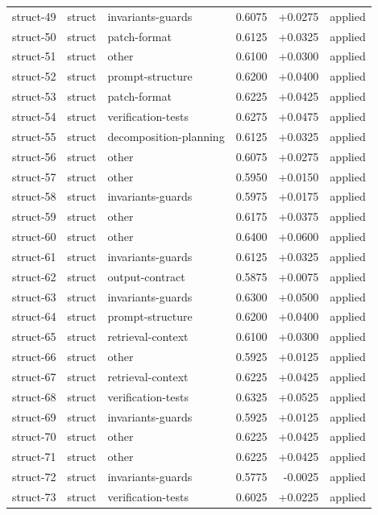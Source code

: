 \begin{center}
\begin{longtable}{llp{5.2cm}rrl}
struct-49 & struct & invariants-guards & 0.6075 & +0.0275 & applied \\
struct-50 & struct & patch-format & 0.6125 & +0.0325 & applied \\
struct-51 & struct & other & 0.6100 & +0.0300 & applied \\
struct-52 & struct & prompt-structure & 0.6200 & +0.0400 & applied \\
struct-53 & struct & patch-format & 0.6225 & +0.0425 & applied \\
struct-54 & struct & verification-tests & 0.6275 & +0.0475 & applied \\
struct-55 & struct & decomposition-planning & 0.6125 & +0.0325 & applied \\
struct-56 & struct & other & 0.6075 & +0.0275 & applied \\
struct-57 & struct & other & 0.5950 & +0.0150 & applied \\
struct-58 & struct & invariants-guards & 0.5975 & +0.0175 & applied \\
struct-59 & struct & other & 0.6175 & +0.0375 & applied \\
struct-60 & struct & other & 0.6400 & +0.0600 & applied \\
struct-61 & struct & invariants-guards & 0.6125 & +0.0325 & applied \\
struct-62 & struct & output-contract & 0.5875 & +0.0075 & applied \\
struct-63 & struct & invariants-guards & 0.6300 & +0.0500 & applied \\
struct-64 & struct & prompt-structure & 0.6200 & +0.0400 & applied \\
struct-65 & struct & retrieval-context & 0.6100 & +0.0300 & applied \\
struct-66 & struct & other & 0.5925 & +0.0125 & applied \\
struct-67 & struct & retrieval-context & 0.6225 & +0.0425 & applied \\
struct-68 & struct & verification-tests & 0.6325 & +0.0525 & applied \\
struct-69 & struct & invariants-guards & 0.5925 & +0.0125 & applied \\
struct-70 & struct & other & 0.6225 & +0.0425 & applied \\
struct-71 & struct & other & 0.6225 & +0.0425 & applied \\
struct-72 & struct & invariants-guards & 0.5775 & -0.0025 & applied \\
struct-73 & struct & verification-tests & 0.6025 & +0.0225 & applied \\

\end{longtable}
\end{center}
